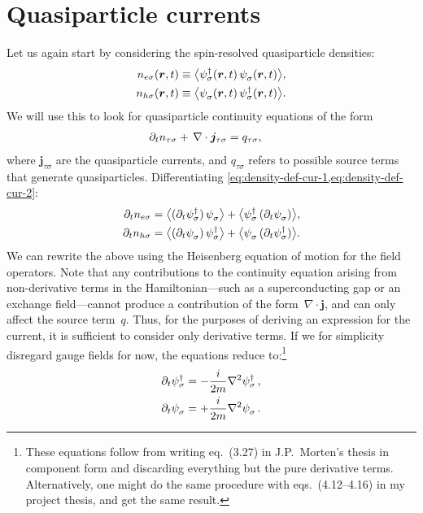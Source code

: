 \section{Quasiparticle currents}
Let us again start by considering the spin-resolved quasiparticle densities:\
\begin{align}
  \label{eq:density-def-cur-1}
  n_{e\sigma}(\bm r, t) &\equiv \avg[\big]{\hc{\psi_\sigma}(\bm r,t)\, \pc{\psi_\sigma}(\bm r,t)}, \\
  \label{eq:density-def-cur-2}
  n_{h\sigma}(\bm r, t) &\equiv \avg[\big]{\pc{\psi_\sigma}(\bm r,t)\, \hc{\psi_\sigma}(\bm r,t)}.
\end{align}
We will use this to look for quasiparticle continuity equations of the form
\begin{align}
  \label{eq:continuity-def}
  \partial_{t} n_{\tau\sigma} +\, \nabla\cdot\bm{j}_{\tau\sigma} &= q_{\tau\sigma}, 
\end{align}
where $\bm{j}_{\tau\sigma}$ are the quasiparticle currents, and $q_{\tau\sigma}$ refers to possible source terms that generate quasiparticles.
Differentiating \cref{eq:density-def-cur-1,eq:density-def-cur-2}:
\begin{align}
  \label{eq:density-der-cur-1}
  \p t n_{e\sigma} &=
  \avg[\big]{(\p t \hc{\psi_{\sigma}})\, \pc{\psi_{\sigma}}} +
  \avg[\big]{\hc{\psi_{\sigma}}\, (\p t \pc{\psi_{\sigma}})} , \\
  \label{eq:density-der-cur-2}
  \p t n_{h\sigma} &=
  \avg[\big]{(\p t \pc{\psi_{\sigma}})\, \hc{\psi_{\sigma}}} +
  \avg[\big]{\pc{\psi_{\sigma}}\, (\p t \hc{\psi_{\sigma}})} .
\end{align}
We can rewrite the above using the Heisenberg equation of motion for the field operators.
Note that any contributions to the continuity equation arising from non-derivative terms in the Hamiltonian---such as a superconducting gap or an exchange field---cannot produce a contribution of the form~$\nabla\cdot\bm{j}$, and can only affect the source term~$q$.
Thus, for the purposes of deriving an expression for the current, it is sufficient to consider only derivative terms.
If we for simplicity disregard gauge fields for now, the equations reduce to:\footnote{These equations follow from writing eq.~(3.27) in J.P.~Morten's thesis in component form and discarding everything but the pure derivative terms. Alternatively, one might do the same procedure with eqs.~(4.12--4.16) in my project thesis, and get the same result.}
\begin{align}
  \p t \hc{\psi_\sigma} &= -\frac{i}{2m} \nabla^2\hc{\psi_\sigma}\,, \\
  \p t \pc{\psi_\sigma} &= +\frac{i}{2m} \nabla^2\pc{\psi_\sigma}\,.
\end{align}
